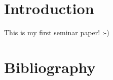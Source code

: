 \section{Introduction}
\label{section:Introduction}

This is my first seminar paper! :-)

\section{Bibliography}
\textcite[]{Eriksson2011}
\textcite[]{Lei2013}
\textcite[]{Kleindessner2019}
\textcite[]{Yu2004}
\textcite[]{Kawale2013}
\textcite[]{VonLuxburg2007}
\textcite[]{Ng2001}
\textcite[]{Schmidt2018}
\textcite[]{Barlow1989}
\textcite[]{Chierichetti2018}
\textcite[]{Xu2010}
\textcite[]{Bera2019}
